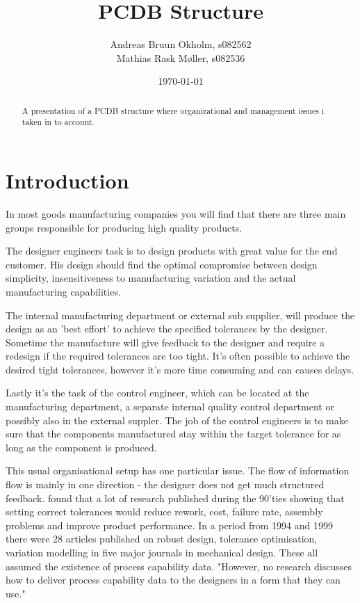 \documentclass[aip,amsmath,reprint, author-year]{revtex4-1}
\begin{document}
\begin{abstract}
A presentation of a PCDB structure where organizational and management issues i taken in to account.
\end{abstract}

\title{PCDB Structure}
\author{Andreas Bruun Okholm, s082562\\
Mathias Rask Møller, s082536 }  
 
\date{\today}
\maketitle


\section{Introduction}
In most goods manufacturing companies you will find that there are three main groups responsible for producing high quality products.

The designer engineers task is to design products with great value for the end customer. 
His design should find the optimal compromise between design simplicity, insensitiveness to manufacturing variation and the actual manufacturing capabilities. 

The internal manufacturing department or external sub supplier, will produce the design as an 'best effort' to achieve the specified tolerances by the designer. Sometime the manufacture will give feedback to the designer and require a redesign if the required tolerances are too tight. It's often possible to achieve the desired tight tolerances, however it's more time consuming and can causes delays.

Lastly it's the task of the control engineer, which can be located at the manufacturing department, a separate internal quality control department or possibly also in the external suppler. 
The job of the control engineers is to make sure that the components manufactured stay within the target tolerance for as long as the component is produced.

This usual organisational setup has one particular issue. 
The flow of information flow is mainly in one direction - the designer does not get much structured feedback. \citet{tata1999process} found that a lot of research published during the 90'ties showing that setting correct tolerances would reduce rework, cost, failure rate, assembly problems and improve product performance. 
In a period from 1994 and 1999 there were 28 articles published on robust design, tolerance optimisation, variation modelling in five major journals in mechanical design. 
These all assumed the existence of process capability data. 
"However, no research discusses how to deliver process capability data to the designers in a form that they can use." \cite{tata1999process}
\end{document}
